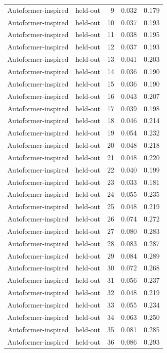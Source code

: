 \begin{tabular}{llrrr}
Autoformer-inspired & held-out & 9 & 0.032 & 0.179 \\
Autoformer-inspired & held-out & 10 & 0.037 & 0.193 \\
Autoformer-inspired & held-out & 11 & 0.038 & 0.195 \\
Autoformer-inspired & held-out & 12 & 0.037 & 0.193 \\
Autoformer-inspired & held-out & 13 & 0.041 & 0.203 \\
Autoformer-inspired & held-out & 14 & 0.036 & 0.190 \\
Autoformer-inspired & held-out & 15 & 0.036 & 0.190 \\
Autoformer-inspired & held-out & 16 & 0.043 & 0.207 \\
Autoformer-inspired & held-out & 17 & 0.039 & 0.198 \\
Autoformer-inspired & held-out & 18 & 0.046 & 0.214 \\
Autoformer-inspired & held-out & 19 & 0.054 & 0.232 \\
Autoformer-inspired & held-out & 20 & 0.048 & 0.218 \\
Autoformer-inspired & held-out & 21 & 0.048 & 0.220 \\
Autoformer-inspired & held-out & 22 & 0.040 & 0.199 \\
Autoformer-inspired & held-out & 23 & 0.033 & 0.181 \\
Autoformer-inspired & held-out & 24 & 0.055 & 0.235 \\
Autoformer-inspired & held-out & 25 & 0.048 & 0.219 \\
Autoformer-inspired & held-out & 26 & 0.074 & 0.272 \\
Autoformer-inspired & held-out & 27 & 0.080 & 0.283 \\
Autoformer-inspired & held-out & 28 & 0.083 & 0.287 \\
Autoformer-inspired & held-out & 29 & 0.084 & 0.289 \\
Autoformer-inspired & held-out & 30 & 0.072 & 0.268 \\
Autoformer-inspired & held-out & 31 & 0.056 & 0.237 \\
Autoformer-inspired & held-out & 32 & 0.048 & 0.219 \\
Autoformer-inspired & held-out & 33 & 0.055 & 0.234 \\
Autoformer-inspired & held-out & 34 & 0.063 & 0.250 \\
Autoformer-inspired & held-out & 35 & 0.081 & 0.285 \\
Autoformer-inspired & held-out & 36 & 0.086 & 0.293 \\

\end{tabular}
